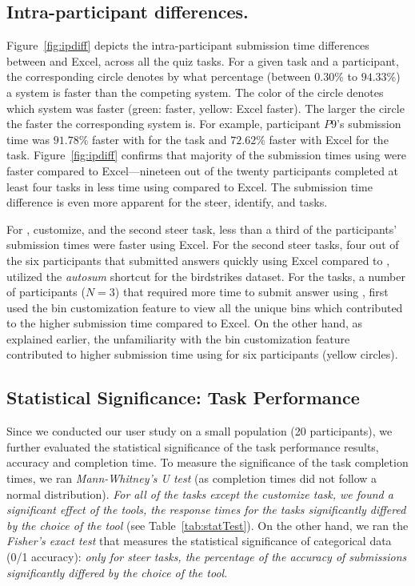 \subsection{Intra-participant differences.}
Figure~\ref{fig:ipdiff} depicts the intra-participant submission time differences between \noah and Excel, across all the quiz tasks.
For a given task and a participant, the corresponding circle denotes by what percentage (between $0.30\%$ to $94.33\%$) a system is faster than the competing system. The color of the circle denotes which system was faster (green: \noah faster, yellow: Excel faster). The larger the circle the faster the corresponding system is. For example, participant $P9$'s submission time was $91.78\%$ faster with \noah for the \cmpB task and $72.62\%$ faster with Excel for the \cmpA task. Figure~\ref{fig:ipdiff} confirms that majority of the submission times using \noah were faster compared to Excel---nineteen out of the twenty participants completed at least four tasks in less time using \noah compared to Excel. The submission time difference is even more apparent for the steer, identify, and \cmpB tasks.

For \cmpA, customize, and the second steer task, less than a third of the participants' submission times were faster using Excel. 
For the second steer tasks, four out of the six participants that submitted answers quickly using Excel compared to \noah, utilized the \emph{autosum} shortcut for the birdstrikes dataset. For the \cmpA tasks, a number of participants ($N=3$) that required more time to submit answer using \noah, first used the bin customization feature to view all the unique bins which contributed to the higher submission time compared to Excel. On the other hand, as explained earlier, the unfamiliarity with the bin customization feature contributed to higher submission time using \noah for six participants (yellow circles).

\subsection{Statistical Significance: Task Performance}
Since we conducted our user study on a small population (20 participants), we further evaluated the statistical significance of the task performance results, \ie accuracy and completion time. 
To measure the significance of the task completion times, we ran \emph{Mann-Whitney's U test} (as completion times did not follow a normal distribution). \emph{For all of the tasks except the customize task, we found a significant effect of the tools, \ie the response times for the tasks significantly differed by the choice of the tool} (see Table~\ref{tab:statTest}). 
On the other hand, we ran the \emph{Fisher's exact test} that measures the statistical significance of categorical data (0/1 accuracy): \emph{only for steer tasks, the percentage of the accuracy of submissions significantly differed by the choice of the tool}. 


